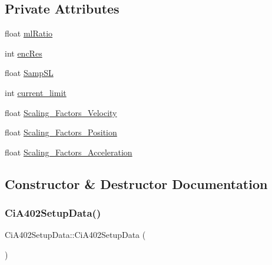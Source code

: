 \subsection*{Private Attributes}
\begin{DoxyCompactItemize}
\item 
float \hyperlink{classCiA402SetupData_a35fc6c4d83a6b9cbb784532d75cf03b3}{ml\+Ratio}
\item 
int \hyperlink{classCiA402SetupData_a8d83cf7dce1f2aeaec2200c7567952b4}{enc\+Res}
\item 
float \hyperlink{classCiA402SetupData_a7dc6400c193ecfe21977437e7c5ac85f}{Samp\+SL}
\item 
int \hyperlink{classCiA402SetupData_a66da9919252d096f1190a70465dce20f}{current\+\_\+limit}
\item 
float \hyperlink{classCiA402SetupData_a1ac5a8bab56e6282f87684d4c7249225}{Scaling\+\_\+\+Factors\+\_\+\+Velocity}
\item 
float \hyperlink{classCiA402SetupData_a81ef1e6479ad92e748e33921dbf3cd25}{Scaling\+\_\+\+Factors\+\_\+\+Position}
\item 
float \hyperlink{classCiA402SetupData_afa253899425284c2fa62fdb678dc4907}{Scaling\+\_\+\+Factors\+\_\+\+Acceleration}
\end{DoxyCompactItemize}


\subsection{Constructor \& Destructor Documentation}
\mbox{\label{classCiA402SetupData_a75fda7c40eed83f736c227cf681bd0c5}} 
\subsubsection{\texorpdfstring{Ci\+A402\+Setup\+Data()}{CiA402SetupData()}\hspace{0.1cm}{\footnotesize\ttfamily [1/2]}}
{\footnotesize\ttfamily Ci\+A402\+Setup\+Data\+::\+Ci\+A402\+Setup\+Data (\begin{DoxyParamCaption}{ }\end{DoxyParamCaption})}

\mbox{\label{classCiA402SetupData_ae7f96988b42fad6572e8227c5a6d1093}} 
